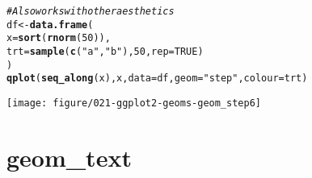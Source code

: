 \documentclass[a4paper,titlepage]{tufte-handout}\usepackage[]{graphicx}\usepackage[]{color}
\makeatletter
\def\maxwidth{ %
  \ifdim\Gin@nat@width>\linewidth
    \linewidth
  \else
    \Gin@nat@width
  \fi
}
\newcommand{\hlnum}[1]{\textcolor[rgb]{0.686,0.059,0.569}{#1}}%
\newcommand{\hlstr}[1]{\textcolor[rgb]{0.192,0.494,0.8}{#1}}%
\newcommand{\hlcom}[1]{\textcolor[rgb]{0.678,0.584,0.686}{\textit{#1}}}%
\newcommand{\hlstd}[1]{\textcolor[rgb]{0.345,0.345,0.345}{#1}}%
\newcommand{\hlkwb}[1]{\textcolor[rgb]{0.69,0.353,0.396}{#1}}%
\newcommand{\hlkwc}[1]{\textcolor[rgb]{0.333,0.667,0.333}{#1}}%
\newcommand{\hlkwd}[1]{\textcolor[rgb]{0.737,0.353,0.396}{\textbf{#1}}}%
\newenvironment{kframe}{%
 \def\at@end@of@kframe{}%
 \ifinner\ifhmode%
  \def\at@end@of@kframe{\end{minipage}}%
  \begin{minipage}{\columnwidth}%
 \fi\fi%
 \def\FrameCommand##1{\hskip\@totalleftmargin \hskip-\fboxsep
 \colorbox{shadecolor}{##1}\hskip-\fboxsep
     \hskip-\linewidth \hskip-\@totalleftmargin \hskip\columnwidth}%
 \MakeFramed {\advance\hsize-\width
   \@totalleftmargin\z@ \linewidth\hsize
   \@setminipage}}%
 {\par\unskip\endMakeFramed%
 \at@end@of@kframe}
\newenvironment{knitrout}{}{} %
\makeatother
\begin{document}
\begin{knitrout}
\begin{kframe}
\begin{alltt}
\hlcom{# Also works with other aesthetics}
\hlstd{df} \hlkwb{<-} \hlkwd{data.frame}\hlstd{(}
  \hlkwc{x} \hlstd{=} \hlkwd{sort}\hlstd{(}\hlkwd{rnorm}\hlstd{(}\hlnum{50}\hlstd{)),}
  \hlkwc{trt} \hlstd{=} \hlkwd{sample}\hlstd{(}\hlkwd{c}\hlstd{(}\hlstr{"a"}\hlstd{,} \hlstr{"b"}\hlstd{),} \hlnum{50}\hlstd{,} \hlkwc{rep} \hlstd{=} \hlnum{TRUE}\hlstd{)}
\hlstd{)}
\hlkwd{qplot}\hlstd{(}\hlkwd{seq_along}\hlstd{(x), x,} \hlkwc{data} \hlstd{= df,} \hlkwc{geom}\hlstd{=}\hlstr{"step"}\hlstd{,} \hlkwc{colour} \hlstd{= trt)}
\end{alltt}
\end{kframe}
\texttt{[image: figure/021-ggplot2-geoms-geom\_step6]} 
\begin{kframe}\begin{alltt}


\end{alltt}
\end{kframe}
\end{knitrout}



\section{geom\_text}
\end{document}
